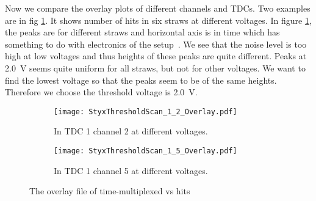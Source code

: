 Now we compare the overlay plots of different channels and TDCs. Two examples are in fig \ref{fig:Overlay}. It shows number of hits in six straws at different voltages. In figure \ref{fig:Overlay}, the peaks are for different straws and horizontal axis is in time which has something to do with electronics of the setup~\cite{manual}. We see that the noise level is too high at low voltages and thus heights of these peaks are quite different. Peaks at \SI{2.0}{\volt} seems quite uniform for all straws, but not for other voltages. We want to find the lowest voltage so that the peaks seem to be of the same heights. Therefore we choose the threshold voltage is \SI{2.0}{\volt}.

\begin{figure}[H]
	\centering
\begin{subfigure}{0.8\textwidth}
 \begin{center}
 \texttt{[image: StyxThresholdScan\_1\_2\_Overlay.pdf]}
 \end{center}
 	\caption{In TDC 1 channel 2 at different voltages.}
 \end{subfigure}
 
 \begin{subfigure}{0.8\textwidth}
 	\begin{center}
 \texttt{[image: StyxThresholdScan\_1\_5\_Overlay.pdf]}
 	\end{center}
 	\caption{In TDC 1 channel 5 at different voltages.}
 \end{subfigure}
 \caption{The overlay file of time-multiplexed vs hits}
 	\label{fig:Overlay}
 \end{figure}
 
 

 
	
